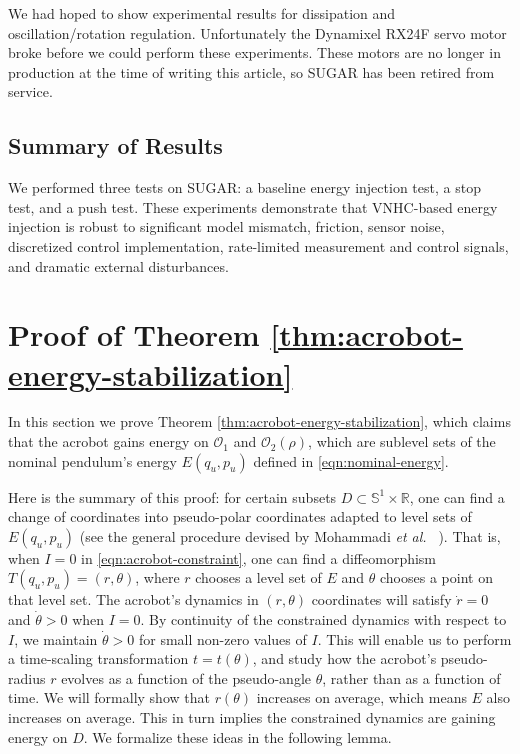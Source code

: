 \documentclass[journal,twoside,web, onecolumn, draftcls]{ieeecolor}
\newcommand*{\R}{\mathbb{R}}
\newcommand*{\Sone}{\mathbb{S}^1}
\newcommand*{\SxR}{\Sone \times \R}
\newcommand*{\etal}{\MakeLowercase{\textit{et al.~}}}
\begin{document}
We had hoped to show experimental results for dissipation and
oscillation/rotation regulation. 
Unfortunately the Dynamixel RX24F servo motor broke before we could perform
these experiments.
These motors are no longer in production at the time of writing this article, so
SUGAR has been retired from service.

\subsection{Summary of Results} 
We performed three tests on SUGAR: a baseline energy injection test,
a stop test, and a push test.
These experiments demonstrate that VNHC-based energy injection is robust to
significant model mismatch, friction, sensor noise, discretized control
implementation, rate-limited measurement and control signals, and dramatic
external disturbances.

\section{Proof of Theorem \ref{thm:acrobot-energy-stabilization}}\label{sec:proof}
In this section we prove Theorem \ref{thm:acrobot-energy-stabilization},
which claims that the acrobot gains energy on \(\mathcal{O}_1\) and
\(\mathcal{O}_2(\rho)\), which are sublevel sets of the nominal pendulum's
energy \(E(q_u,p_u)\) defined in \eqref{eqn:nominal-energy}.

Here is the summary of this proof: for certain subsets
\(D \subset \SxR\), one can find a change of coordinates into 
pseudo-polar coordinates adapted to level sets of \(E(q_u,p_u)\)
(see the general procedure devised by Mohammadi \etal 
\cite{dynamic_vhcs_stabilize_closed_orbits}).
That is, when \(I = 0\) in \eqref{eqn:acrobot-constraint}, one can find
a diffeomorphism \(T(q_u,p_u) =  (r,\theta)\), where \(r\)
chooses a level set of \(E\) and \(\theta\) chooses a point on that level set.
The acrobot's dynamics in \((r,\theta)\) coordinates will satisfy 
\(\dot{r} = 0\) and \(\dot{\theta} > 0\) when \(I = 0\).
By continuity of the constrained dynamics with respect to \(I\),
we maintain \(\dot{\theta} > 0\) for small non-zero values of \(I\).
This will enable us to perform a time-scaling transformation 
\(t = t(\theta)\), and study how the acrobot's pseudo-radius \(r\) evolves as a
function of the pseudo-angle \(\theta\), rather than as a function of time.
We will formally show that \(r(\theta)\) increases on average, which means
\(E\) also increases on average.
This in turn implies the constrained dynamics are gaining energy on \(D\).
We formalize these ideas in the following lemma.
\end{document}
